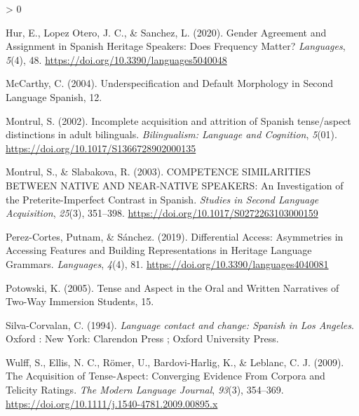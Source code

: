 \documentclass[
  english,
  man,floatsintext]{apa6}
\newlength{\cslhangindent}
\newenvironment{CSLReferences}[2] %
 {%
  \setlength{\parindent}{0pt}
  \ifodd #1 \everypar{\setlength{\hangindent}{\cslhangindent}}\ignorespaces\fi
  \ifnum #2 > 0
  \setlength{\parskip}{#2\baselineskip}
  \fi
 }%
 {}
\begin{document}
\begin{CSLReferences}{1}{0}
\leavevmode\hypertarget{ref-hur_gender_2020}{}%
Hur, E., Lopez Otero, J. C., \& Sanchez, L. (2020). Gender {Agreement} and {Assignment} in {Spanish} {Heritage} {Speakers}: {Does} {Frequency} {Matter}? \emph{Languages}, \emph{5}(4), 48. \url{https://doi.org/10.3390/languages5040048}

\leavevmode\hypertarget{ref-mccarthy_underspecification_2004}{}%
McCarthy, C. (2004). Underspecification and {Default} {Morphology} in {Second} {Language} {Spanish}, 12.

\leavevmode\hypertarget{ref-montrul_incomplete_2002}{}%
Montrul, S. (2002). Incomplete acquisition and attrition of {Spanish} tense/aspect distinctions in adult bilinguals. \emph{Bilingualism: Language and Cognition}, \emph{5}(01). \url{https://doi.org/10.1017/S1366728902000135}

\leavevmode\hypertarget{ref-montrul_competence_2003}{}%
Montrul, S., \& Slabakova, R. (2003). {COMPETENCE} {SIMILARITIES} {BETWEEN} {NATIVE} {AND} {NEAR}-{NATIVE} {SPEAKERS}: {An} {Investigation} of the {Preterite}-{Imperfect} {Contrast} in {Spanish}. \emph{Studies in Second Language Acquisition}, \emph{25}(3), 351--398. \url{https://doi.org/10.1017/S0272263103000159}

\leavevmode\hypertarget{ref-perez-cortes_differential_2019}{}%
Perez-Cortes, Putnam, \& Sánchez. (2019). Differential {Access}: {Asymmetries} in {Accessing} {Features} and {Building} {Representations} in {Heritage} {Language} {Grammars}. \emph{Languages}, \emph{4}(4), 81. \url{https://doi.org/10.3390/languages4040081}

\leavevmode\hypertarget{ref-potowski_tense_2005}{}%
Potowski, K. (2005). Tense and {Aspect} in the {Oral} and {Written} {Narratives} of {Two}-{Way} {Immersion} {Students}, 15.

\leavevmode\hypertarget{ref-silva-corvalan_language_1994}{}%
Silva-Corvalan, C. (1994). \emph{Language contact and change: {Spanish} in {Los} {Angeles}}. Oxford : New York: Clarendon Press ; Oxford University Press.

\leavevmode\hypertarget{ref-wulff_acquisition_2009}{}%
Wulff, S., Ellis, N. C., Römer, U., Bardovi-Harlig, K., \& Leblanc, C. J. (2009). The {Acquisition} of {Tense}-{Aspect}: {Converging} {Evidence} {From} {Corpora} and {Telicity} {Ratings}. \emph{The Modern Language Journal}, \emph{93}(3), 354--369. \url{https://doi.org/10.1111/j.1540-4781.2009.00895.x}

\end{CSLReferences}
\end{document}

